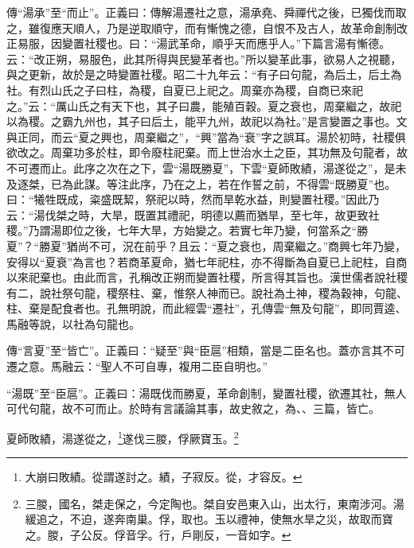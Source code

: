 {\noindent\zhuan{}\fzbyks 傳“湯承”至“而止”。正義曰：傳解湯遷社之意，湯承堯、舜禪代之後，已獨伐而取之，雖復應天順人，乃是逆取順守，而有慚愧之德，自恨不及古人，故革命創制改正易服，因變置社稷也。曰：“湯武革命，順乎天而應乎人。”下篇言湯有慚德。云：“改正朔，易服色，此其所得與民變革者也。”所以變革此事，欲易人之視聽，與之更新，故於是之時變置社稷。昭二十九年云：“有子曰句龍，為后土，后土為社。有烈山氏之子曰柱，為稷，自夏已上祀之。周棄亦為稷，自商已來祀之。”云：“厲山氏之有天下也，其子曰農，能殖百穀。夏之衰也，周棄繼之，故祀以為稷。之霸九州也，其子曰后土，能平九州，故祀以為社。”是言變置之事也。文與正同，而云“夏之興也，周棄繼之”，“興”當為“衰”字之誤耳。湯於初時，社稷俱欲改之。周棄功多於柱，即令廢柱祀棄。而上世治水土之臣，其功無及句龍者，故不可遷而止。此序之次在之下，雲“湯既勝夏”，下雲“夏師敗績，湯遂從之”，是未及逐桀，已為此謀。等注此序，乃在之上，若在作誓之前，不得雲“既勝夏”也。曰：“犧牲既成，粢盛既絜，祭祀以時，然而旱乾水益，則變置社稷。”因此乃云：“湯伐桀之時，大旱，既置其禮祀，明德以薦而猶旱，至七年，故更致社稷。”乃謂湯即位之後，七年大旱，方始變之。若實七年乃變，何當系之“勝夏”？“勝夏”猶尚不可，況在前乎？且云：“夏之衰也，周棄繼之。”商興七年乃變，安得以“夏衰”為言也？若商革夏命，猶七年祀柱，亦不得斷為自夏已上祀柱，自商以來祀棄也。由此而言，孔稱改正朔而變置社稷，所言得其旨也。漢世儒者說社稷有二，說社祭句龍，稷祭柱、棄，惟祭人神而已。說社為土神，稷為穀神，句龍、柱、棄是配食者也。孔無明說，而此經雲“遷社”，孔傳雲“無及句龍”，即同賈逵、馬融等說，以社為句龍也。 \par}

{\noindent\zhuan{}\fzbyks 傳“言夏”至“皆亡”。正義曰：“疑至”與“臣扈”相類，當是二臣名也。蓋亦言其不可遷之意。馬融云：“聖人不可自專，複用二臣自明也。” \par}

{\noindent\shu{}\fzkt “湯既”至“臣扈”。正義曰：湯既伐而勝夏，革命創制，變置社稷，欲遷其社，無人可代句龍，故不可而止。於時有言議論其事，故史敘之，為、、三篇，皆亡。 \par}

夏師敗績，湯遂從之，\footnote{大崩曰敗績。從謂遂討之。績，子寂反。從，才容反。}遂伐三朡，俘厥寶玉。\footnote{三朡，國名，桀走保之，今定陶也。桀自安邑東入山，出太行，東南涉河。湯緩追之，不迫，遂奔南巢。俘，取也。玉以禮神，使無水旱之災，故取而寶之。朡，子公反。俘音孚。行，戶剛反，一音如字。}

